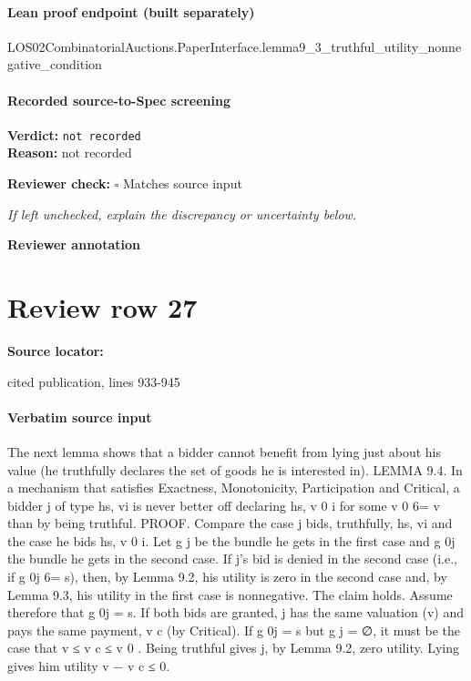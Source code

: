 \documentclass[10pt]{article}
\newcommand{\reviewerbox}{%
  \par\noindent\fbox{\parbox{0.96\linewidth}{\rule{0pt}{0.38in}}}\par
}
\newcommand{\reviewmatch}[1]{%
  \par\noindent\textbf{Reviewer check:} $\square$\; #1\par
  \noindent\emph{If left unchecked, explain the discrepancy or uncertainty below.}\par
}
\begin{document}
\paragraph{Lean proof endpoint (built separately)}\begin{ReviewVerbatim}
LOS02CombinatorialAuctions.PaperInterface.lemma9_3_truthful_utility_nonnegative_condition
\end{ReviewVerbatim}

\paragraph{Recorded source-to-Spec screening}
\textbf{Verdict:} \texttt{not recorded}
\\
\textbf{Reason:} not recorded
\reviewmatch{Matches source input}
\noindent\textbf{Reviewer annotation}\par
\reviewerbox
\clearpage
\hypertarget{source-claim-ea97aef832b046f9}{}
\section*{Review row 27}
\textbf{Source locator:} {\footnotesize\raggedright cited publication, lines 933-\allowbreak{}945\par}
\paragraph{Verbatim source input}
\begin{ReviewVerbatim}
The next lemma shows that a bidder cannot benefit from lying just about his
value (he truthfully declares the set of goods he is interested in).
LEMMA 9.4. In a mechanism that satisfies Exactness, Monotonicity, Participation and Critical, a bidder j of type hs, vi is never better off declaring hs, v 0 i for
some v 0 6= v than by being truthful.
PROOF. Compare the case j bids, truthfully, hs, vi and the case he bids hs, v 0 i.
Let g j be the bundle he gets in the first case and g 0j the bundle he gets in the second
case. If j’s bid is denied in the second case (i.e., if g 0j 6= s), then, by Lemma 9.2,
his utility is zero in the second case and, by Lemma 9.3, his utility in the first case
is nonnegative. The claim holds.
Assume therefore that g 0j = s. If both bids are granted, j has the same valuation
(v) and pays the same payment, v c (by Critical). If g 0j = s but g j = ∅, it must be
the case that v ≤ v c ≤ v 0 . Being truthful gives j, by Lemma 9.2, zero utility. Lying
gives him utility v − v c ≤ 0.
\end{ReviewVerbatim}
\end{document}
